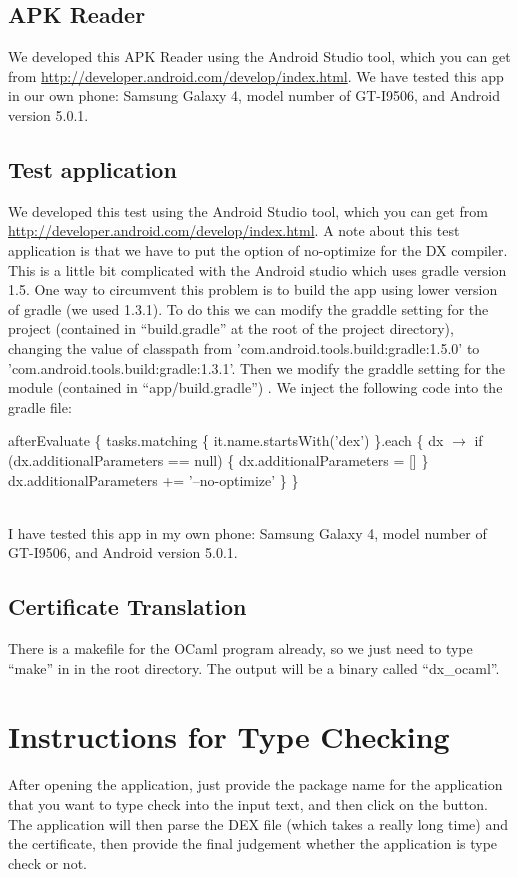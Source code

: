 \documentclass[a4]{article}
\begin{document}
\subsection{APK Reader}
We developed this APK Reader using the Android Studio tool, which you can get from
\href{http://developer.android.com/develop/index.html}{http://developer.android.com/develop/index.html}. 
We have tested this app in our own phone: Samsung Galaxy 4, model number of 
GT-I9506, and Android version 5.0.1. 

\subsection{Test application}
We developed this test using the Android Studio tool, which you can get from
\href{http://developer.android.com/develop/index.html}{http://developer.android.com/develop/index.html}. 
A note about this test application is that we have to put the option of no-optimize for
the DX compiler. This is a little bit complicated with the Android studio which uses
gradle version 1.5. One way to circumvent this problem is to build the app using
lower version of gradle (we used 1.3.1). To do this we can modify the graddle setting
for the project (contained in ``build.gradle'' at the root of the project directory), 
changing the value of classpath from 'com.android.tools.build:gradle:1.5.0' to 
'com.android.tools.build:gradle:1.3.1'.
Then we modify the graddle setting for the module (contained in ``app/build.gradle'') .
We inject the following code into the gradle file:
\begin{algorithm}
\begin{algorithmic}
\STATE afterEvaluate \{
\STATE \hspace{0.5cm}tasks.matching \{ it.name.startsWith('dex') \}.each \{ dx $\rightarrow$
\STATE \hspace{0.5cm}if (dx.additionalParameters == null) \{ dx.additionalParameters = [] \}
\STATE \hspace{0.5cm}dx.additionalParameters += '--no-optimize' \}
\STATE \}
\end{algorithmic}
\end{algorithm}\\
I have tested this app in my own phone: Samsung Galaxy 4, model number of 
GT-I9506, and Android version 5.0.1. 

\subsection{Certificate Translation}
There is a makefile for the OCaml program already, so we just need to type ``make'' in
in the root directory. The output will be a binary called ``dx\_ocaml''.

\section{Instructions for Type Checking}
After opening the application, just provide the package name for the application that
you want to type check into the input text, and then click on the button. The application
will then parse the DEX file (which takes a really long time) and the certificate, then
provide the final judgement whether the application is type check or not.
\end{document}
